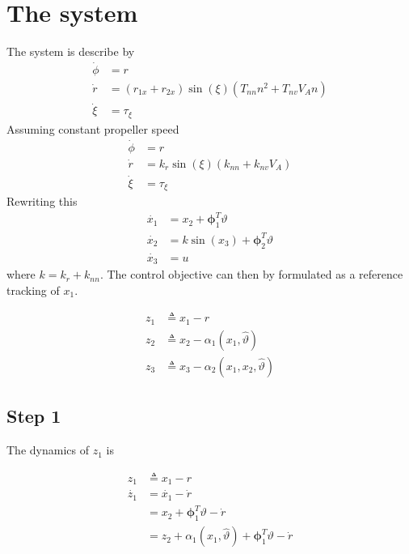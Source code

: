 \documentclass[12pt,a4]{article}
\begin{document}
\section{The system}

The system is describe by
\begin{align*}
	\dot{\phi} & = r                                                     \\
	\dot{r}    & = (r_{1x} + r_{2x})\sin(\xi)(T_{nn} n^2 + T_{nv} V_A n) \\
	\dot{\xi}  & = \tau_\xi
\end{align*}
Assuming constant propeller speed
\begin{align*}
	\dot{\phi} & = r                                \\
	\dot{r}    & = k_r\sin(\xi)(k_{nn} + k_{nv}V_A) \\
	\dot{\xi}  & = \tau_\xi
\end{align*}
Rewriting this
\begin{align*}
	\dot{x_1} & = x_2 + \bm{\phi}_1^T \vartheta         \\
	\dot{x_2} & = k \sin(x_3) + \bm{\phi}_2^T \vartheta \\
	\dot{x_3} & = u
\end{align*}
where $k = k_{r} + k_{nn}$.
The control objective can then by formulated as a reference tracking of $x_1$.

\begin{align*}
	z_1 & \triangleq x_1 - r                                 \\
	z_2 & \triangleq x_2 - \alpha_1(x_1,\hat{\vartheta})     \\
	z_3 & \triangleq x_3 - \alpha_2(x_1,x_2,\hat{\vartheta})
\end{align*}

\subsection{Step 1}
The dynamics of $z_1$ is

\begin{align}
	z_1       & \triangleq x_1 - r                                                        \\
	\dot{z_1} & = \dot{x_1} - \dot{r}                                                     \\
	          & = x_2 + \bm{\phi}_1^T \vartheta - \dot{r}                                 \\
	          & = z_2 + \alpha_1(x_1,\hat{\vartheta}) + \bm{\phi}_1^T \vartheta - \dot{r}
\end{align}
\end{document}
